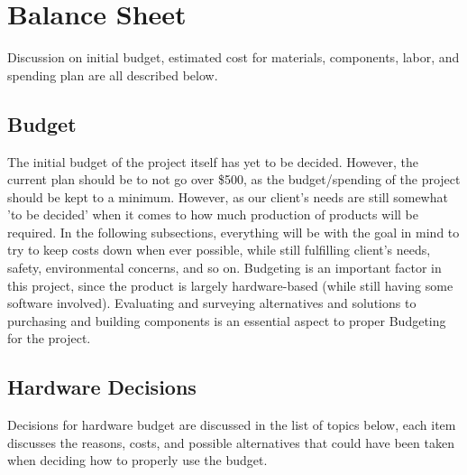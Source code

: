 \documentclass[12pt]{article}
\begin{document}
{{{{{{{	\newpage

\section{Balance Sheet}
Discussion on initial budget, estimated cost for materials, components, labor, and spending plan are all described below.

		\subsection{Budget}
		The initial budget of the project itself has yet to be decided. However, the current plan should be to not go over \$500, as the budget/spending of the project should be kept to a minimum. However, as our client's needs are still somewhat 'to be decided' when it comes to how much production of products will be required. In the following subsections, everything will be with the goal in mind to try to keep costs down when ever possible, while still fulfilling client's needs, safety, environmental concerns, and so on. Budgeting is an important factor in this project, since the product is largely hardware-based (while still having some software involved). Evaluating and surveying alternatives and solutions to purchasing and building components is an essential aspect to proper Budgeting for the project.
		
		\subsection{Hardware Decisions}
		Decisions for hardware budget are discussed in the list of topics below, each item discusses the reasons, costs, and possible alternatives that could have been taken when deciding how to properly use the budget.

}}}}}}}
\end{document}
